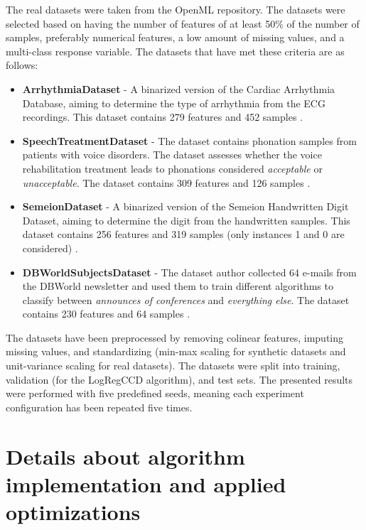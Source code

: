 \documentclass[11pt]{article}
\begin{document}
The real datasets were taken from the OpenML \cite{OpenML2013} repository. The datasets were selected based on having the number of features of at least 50\% of the number of samples, preferably numerical features, a low amount of missing values, and a multi-class response variable. The datasets that have met these criteria are as follows:
\begin{itemize}
    \item \textbf{ArrhythmiaDataset} - A binarized version of the Cardiac Arrhythmia Database, aiming to determine the type of arrhythmia from the ECG recordings. This dataset contains 279 features and 452 samples \cite{arrhythmia_5}.
    \item \textbf{SpeechTreatmentDataset} - The dataset contains phonation samples from patients with voice disorders. The dataset assesses whether the voice rehabilitation treatment leads to phonations considered \textit{acceptable} or \textit{unacceptable}. The dataset contains 309 features and 126 samples \cite{lsvt_voice_rehabilitation_282}.
    
    \item \textbf{SemeionDataset} - A binarized version of the Semeion Handwritten Digit Dataset, aiming to determine the digit from the handwritten samples. This dataset contains 256 features and 319 samples (only instances 1 and 0 are considered) \cite{semeion_handwritten_digit_178}.
    \item \textbf{DBWorldSubjectsDataset} - The dataset author collected 64 e-mails from the DBWorld newsletter and used them to train different algorithms to classify between \textit{announces of conferences} and \textit{everything else}. The dataset contains 230 features and 64 samples \cite{dbworld_e-mails_219}.

\end{itemize}

The datasets have been preprocessed by removing colinear features, imputing missing values, and standardizing (min-max scaling for synthetic datasets and unit-variance scaling for real datasets). The datasets were split into training, validation (for the LogRegCCD algorithm), and test sets. The presented results were performed with five predefined seeds, meaning each experiment configuration has been repeated five times.


\section{Details about algorithm implementation and applied optimizations}
\end{document}
